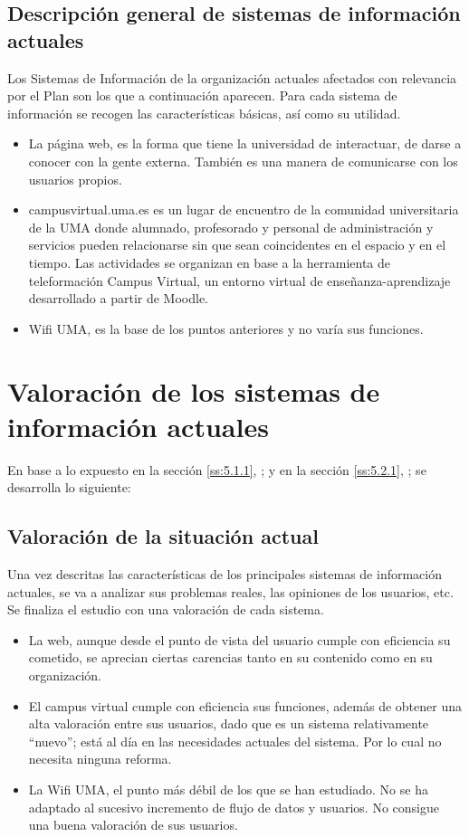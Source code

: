 \documentclass[11pt,a4paper,spanish,twoside]{book}
\begin{document}
\subsection{Descripción general de sistemas de información actuales} 
\label{ss:5.2.1}
Los Sistemas de Información de la organización actuales afectados con 
relevancia por el Plan son los que a continuación aparecen. Para cada sistema 
de información se recogen las características básicas, así como su utilidad.
\begin{itemize}
\item La página web, es la forma que tiene la universidad de interactuar,
  de darse a conocer con la gente externa. También es una manera de
  comunicarse con los usuarios propios.
\item campusvirtual.uma.es es un lugar de encuentro de la comunidad
  universitaria de la UMA donde alumnado, profesorado y personal de
  administración y servicios pueden relacionarse sin que sean coincidentes en
  el espacio y en el tiempo. Las actividades se organizan en base a la
  herramienta de teleformación Campus Virtual, un entorno virtual de
  enseñanza-aprendizaje desarrollado a partir de Moodle. 
\item Wifi UMA, es la base de los puntos anteriores y no varía sus funciones.
\end{itemize}

\section{Valoración de los sistemas de información actuales}
En base a lo expuesto 
en la sección \vref{ss:5.1.1}, \emph{}; y
en la sección \vref{ss:5.2.1}, \emph{}; 
se desarrolla lo siguiente:

\subsection{Valoración de la situación actual} \label{ss:5.3.1}
Una vez descritas las características de los principales sistemas de 
información actuales, se va a analizar sus problemas reales, las opiniones de 
los usuarios, etc. Se finaliza el estudio con una valoración de cada sistema.

\begin{itemize}
  \item La web, aunque desde el punto de vista del usuario cumple con
    eficiencia su cometido, se aprecian ciertas carencias tanto en su
    contenido como en su organización. 
  \item El campus virtual cumple con eficiencia sus funciones, además de
    obtener una alta valoración entre sus usuarios, dado que es un sistema
    relativamente ``nuevo''; está al día en las necesidades actuales del
    sistema. Por lo cual no necesita ninguna reforma. 
  \item La Wifi UMA, el punto más débil de los que se han estudiado. No se ha
    adaptado al sucesivo incremento de flujo de datos y usuarios. No
    consigue una buena valoración de sus usuarios.  
\end{itemize}
\end{document}
